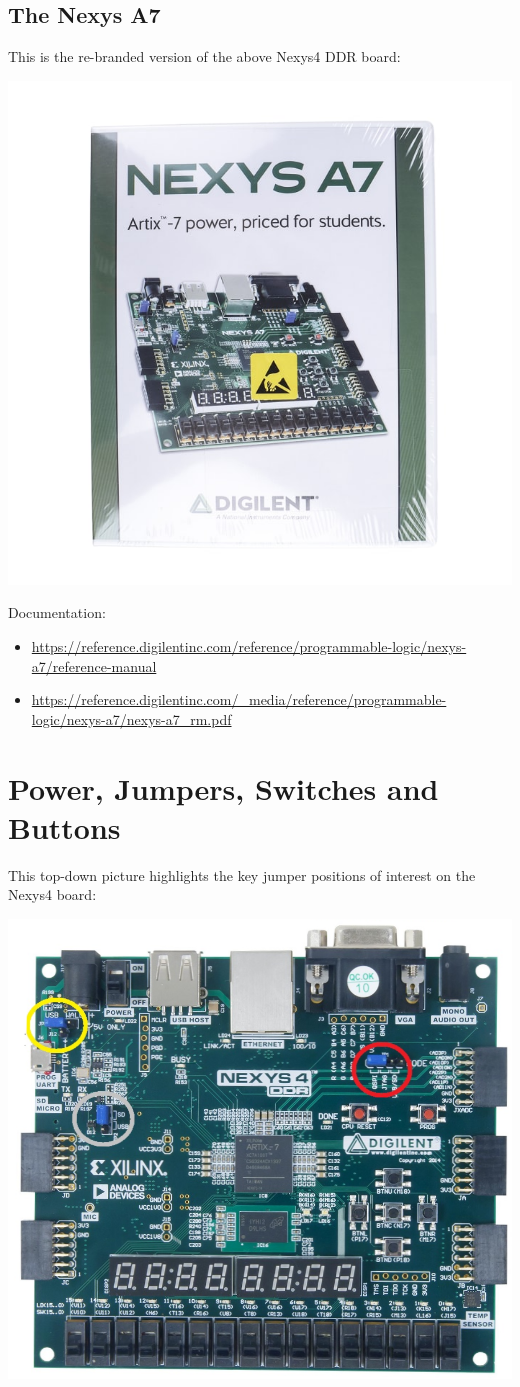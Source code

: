 \begin{minipage}{\linewidth}
  \subsection{The Nexys A7}

  This is the re-branded version of the above Nexys4 DDR board:

  \begin{center}
    \includegraphics[width=0.4\linewidth]{images/img003_nexysA7_board.jpg}
  \end{center}

  Documentation:

  \begin{itemize}
    \item \url{https://reference.digilentinc.com/reference/programmable-logic/nexys-a7/reference-manual}
    \item \url{https://reference.digilentinc.com/\_media/reference/programmable-logic/nexys-a7/nexys-a7\_rm.pdf}
  \end{itemize}
\end{minipage}

\newpage

\section{Power, Jumpers, Switches and Buttons}

This top-down picture highlights the key jumper positions of interest on the Nexys4 board:

  \begin{center}
    \includegraphics[width=0.9\linewidth]{images/nexys4_jumpers.png}
  \end{center}

